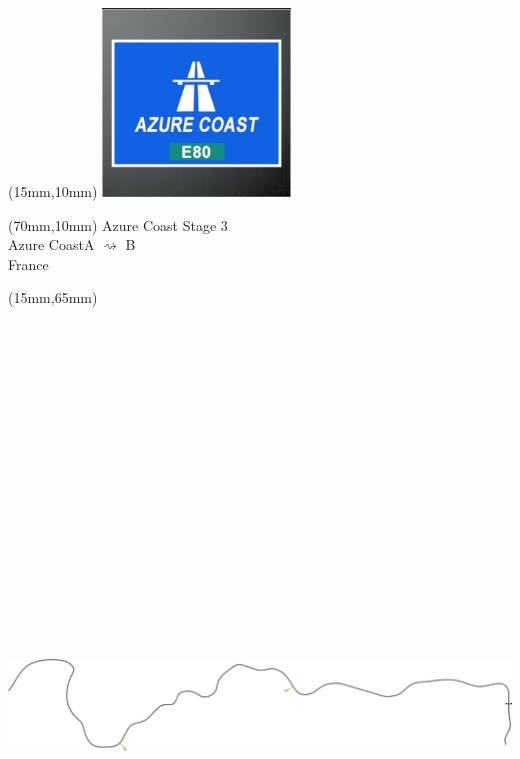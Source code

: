 \null\newpage
\begin{textblock*}{50mm}(15mm,10mm)%
\includegraphics[width=50mm]{LG/2015-05-20_00073.png}
\end{textblock*}
\begin{textblock*}{130mm}(70mm,10mm)%
{\fontsize{20}{20}\selectfont Azure Coast Stage 3\\}
{\fontsize{16}{16}\selectfont Azure Coast\hfill A $\rightsquigarrow$ B\\}
{\fontsize{12}{12}\selectfont France\\}
\end{textblock*}
\begin{textblock*}{185mm}(15mm,65mm)%
\centering
\mbox{\includegraphics[width=185mm,height=210mm,keepaspectratio]{PT/AZCOS3.pdf}}
\end{textblock*}
